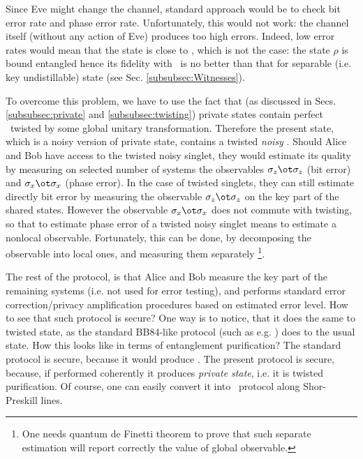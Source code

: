 \documentclass[twocolumn,aps,rmp]{revtex4}
\begin{document}
Since Eve might change the channel, standard approach would be to
check bit error rate and phase error rate. Unfortunately, this would
not work: the channel itself (without any action of Eve) produces
too high errors. Indeed, low error rates would mean that the state is
close to \wsinglet, which is not the case: the state $\rho$ is bound entangled hence its
fidelity with \wsinglet\ is no better than that for separable (i.e. key undistillable) state (see Sec. \ref{subsubsec:Witnesses}).

To overcome this problem, we have to use the fact that  (as discussed in Secs.
\ref{subsubsec:private} and \ref{subsubsec:twisting}) private states
contain perfect \wsinglet\ twisted by some global unitary transformation.
Therefore the present state, which is a noisy version of private
state, contains a twisted {\it noisy} \wsinglet.
Should Alice and Bob have access to the twisted noisy singlet,
they would estimate its quality by measuring on selected number of systems
the observables $\sigma_z\ot \sigma_z$ (bit error) and $\sigma_x\ot \sigma_x$ (phase error).
In the case of twisted singlets, they can still estimate directly bit error by
measuring the observable $\sigma_z\ot \sigma_z$ on the key part
of the shared states. However the observable $\sigma_x\ot \sigma_x$
does not commute with twisting, so that to estimate phase error of a twisted
noisy singlet means to estimate a nonlocal observable.
Fortunately, this can be done, by decomposing the
observable into local ones, and measuring them separately
\footnote{One needs quantum de Finetti theorem to prove that such
separate estimation will report correctly the value of global
observable.}.

The rest of the protocol, is that Alice and Bob measure the key part
of the remaining systems (i.e. not used for error testing),
and performs standard error correction/privacy amplification
procedures based on estimated error level.
How to see that such protocol is secure? One way is to notice, that it does the same to
twisted state, as the standard BB84-like protocol  (such as e.g. \cite{LoChauArdehali2000,lca}) does to the usual state. How
this looks like in terms of entanglement purification? The standard
protocol is secure, because it would produce \singlets. The present
protocol is secure, because, if performed coherently it produces
{\it private state}, i.e. it is twisted purification. Of course, one
can easily convert it into \pmp\ protocol along Shor-Preskill lines.
\end{document}
